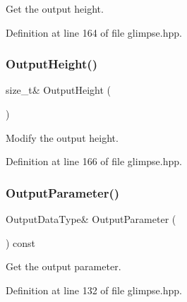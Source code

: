 Get the output height. 



Definition at line 164 of file glimpse.\+hpp.

\mbox{\label{classmlpack_1_1ann_1_1Glimpse_ac5112abf9f5e1face13ed965a8755b1d}} 
\subsubsection{Output\+Height()\hspace{0.1cm}{\footnotesize\ttfamily [2/2]}}
{\footnotesize\ttfamily size\+\_\+t\& Output\+Height (\begin{DoxyParamCaption}{ }\end{DoxyParamCaption})\hspace{0.3cm}{\ttfamily [inline]}}



Modify the output height. 



Definition at line 166 of file glimpse.\+hpp.

\mbox{\label{classmlpack_1_1ann_1_1Glimpse_a8bae962cc603d1cab8d80ec78f8d505d}} 
\subsubsection{Output\+Parameter()\hspace{0.1cm}{\footnotesize\ttfamily [1/2]}}
{\footnotesize\ttfamily Output\+Data\+Type\& Output\+Parameter (\begin{DoxyParamCaption}{ }\end{DoxyParamCaption}) const\hspace{0.3cm}{\ttfamily [inline]}}



Get the output parameter. 



Definition at line 132 of file glimpse.\+hpp.

\mbox{\label{classmlpack_1_1ann_1_1Glimpse_a21d5f745f02c709625a4ee0907f004a5}} 
